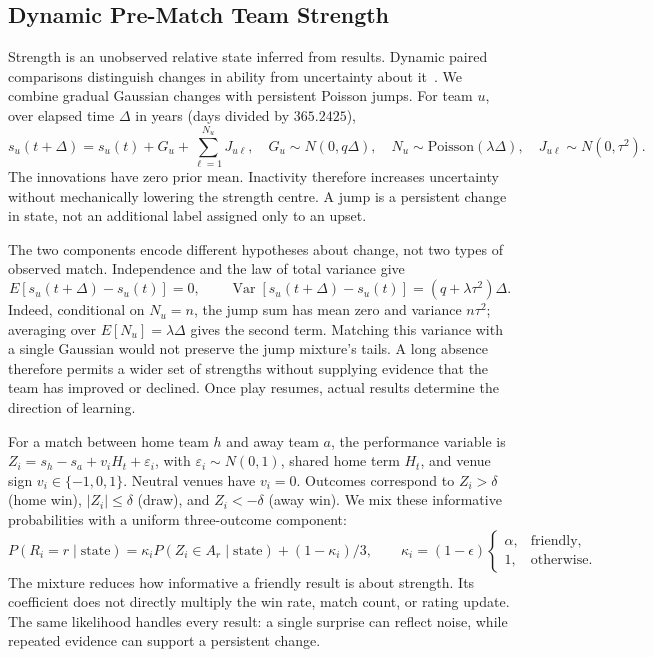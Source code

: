 

\subsection{Dynamic Pre-Match Team Strength}
\label{sec:strength-method}

Strength is an unobserved relative state inferred from results. Dynamic paired comparisons distinguish changes in ability from uncertainty about it~\cite{glickman1999dynamic}. We combine gradual Gaussian changes with persistent Poisson jumps. For team $u$, over elapsed time $\Delta$ in years (days divided by $365.2425$),
\begin{equation}
 s_u(t+\Delta)=s_u(t)+G_u+\sum_{\ell=1}^{N_u}J_{u\ell},\quad
 G_u\sim N(0,q\Delta),\quad N_u\sim\mathrm{Poisson}(\lambda\Delta),\quad
 J_{u\ell}\sim N(0,\tau^2).
 \label{eq:strength-transition}
\end{equation}
The innovations have zero prior mean. Inactivity therefore increases uncertainty without mechanically lowering the strength centre. A jump is a persistent change in state, not an additional label assigned only to an upset.

The two components encode different hypotheses about change, not two types of observed match. Independence and the law of total variance give
\begin{equation}
 E[s_u(t+\Delta)-s_u(t)]=0,\qquad
 \operatorname{Var}[s_u(t+\Delta)-s_u(t)]=(q+\lambda\tau^2)\Delta.
 \label{eq:transition-moments}
\end{equation}
Indeed, conditional on $N_u=n$, the jump sum has mean zero and variance $n\tau^2$; averaging over $E[N_u]=\lambda\Delta$ gives the second term. Matching this variance with a single Gaussian would not preserve the jump mixture's tails. A long absence therefore permits a wider set of strengths without supplying evidence that the team has improved or declined. Once play resumes, actual results determine the direction of learning.

For a match between home team $h$ and away team $a$, the performance variable is $Z_i=s_h-s_a+v_iH_t+\varepsilon_i$, with $\varepsilon_i\sim N(0,1)$, shared home term $H_t$, and venue sign $v_i\in\{-1,0,1\}$. Neutral venues have $v_i=0$. Outcomes correspond to $Z_i>\delta$ (home win), $|Z_i|\leq\delta$ (draw), and $Z_i<-\delta$ (away win). We mix these informative probabilities with a uniform three-outcome component:
\begin{equation}
 P(R_i=r\mid\mathrm{state})=\kappa_i P(Z_i\in A_r\mid\mathrm{state})+(1-\kappa_i)/3,\qquad
 \kappa_i=(1-\epsilon)\begin{cases}\alpha,&\text{friendly},\\1,&\text{otherwise}.\end{cases}
 \label{eq:rating-likelihood}
\end{equation}
The mixture reduces how informative a friendly result is about strength. Its coefficient does not directly multiply the win rate, match count, or rating update. The same likelihood handles every result: a single surprise can reflect noise, while repeated evidence can support a persistent change.

